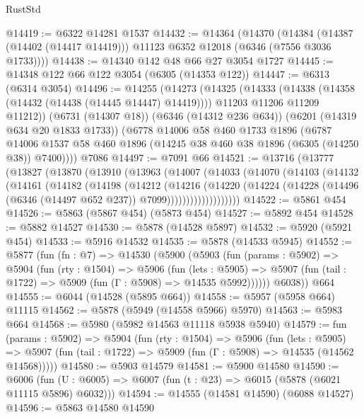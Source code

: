 \begin{lexlean}{RustStd}
\begin{coremodule}
@14419 := @6322 @14281 @1537
@14432 := @14364
    (@14370
      (@14384 (@14387 (@14402 (@14417 @14419))) @11123 @6352 @12018 (@6346 (@7556 @3036 @1733))))
@14438 := @14340 @142 @48 @66 @27 @3054 @1727
@14445 := @14348 @122 @66 @122 @3054 (@6305 (@14353 @122))
@14447 := @6313 (@6314 @3054)
@14496 := @14255
    (@14273
      (@14325
        (@14333
          (@14338 (@14358 (@14432 (@14438 (@14445 @14447) @14419))))
          @11203
          @11206
          @11209
          @11212))
      (@6731 (@14307 @18))
      (@6346 (@14312 @236 @634))
      (@6201 (@14319 @634 @20 @1833 @1733))
      (@6778
        @14006
        @58
        @460
        @1733
        @1896
        (@6787 @14006 @1537 @58 @460 @1896 (@14245 @38 @460 @38 @1896 (@6305 (@14250 @38)) @7400))))
    @7086
@14497 := @7091 @66
@14521 := @13716
    (@13777
      (@13827
        (@13870
          (@13910
            (@13963
              (@14007
                (@14033
                  (@14070
                    (@14103
                      (@14132
                        (@14161
                          (@14182
                            (@14198
                              (@14212
                                (@14216
                                  (@14220
                                    (@14224
                                      (@14228
                                        (@14496 (@6346 (@14497 @652 @237)) @7099)))))))))))))))))))
@14522 := @5861 @454
@14526 := @5863 (@5867 @454) (@5873 @454)
@14527 := @5892 @454
@14528 := @5882 @14527
@14530 := @5878 (@14528 @5897)
@14532 := @5920 (@5921 @454)
@14533 := @5916 @14532
@14535 := @5878 (@14533 @5945)
@14552 := @5877
    (fun (fn : @7) =>
    @14530
      (@5900
        (@5903
          (fun (params : @5902) =>
          @5904
            (fun (rty : @1504) =>
            @5906
              (fun (lets : @5905) =>
              @5907 (fun (tail : @1722) => @5909 (fun (Γ : @5908) => @14535 @5992))))))
        @6038))
    @664
@14555 := @6044 (@14528 (@5895 @664))
@14558 := @5957 (@5958 @664) @11115
@14562 := @5878 (@5949 (@14558 @5966) @5970)
@14563 := @5983 @664
@14568 := @5980 (@5982 @14563 @11118 @5938 @5940)
@14579 := fun (params : @5902) =>
  @5904
    (fun (rty : @1504) =>
    @5906
      (fun (lets : @5905) =>
      @5907 (fun (tail : @1722) => @5909 (fun (Γ : @5908) => @14535 (@14562 @14568)))))
@14580 := @5903 @14579
@14581 := @5900 @14580
@14590 := @6006
    (fun (U : @6005) => @6007 (fun (t : @23) => @6015 (@5878 (@6021 @11115 @5896) @6032)))
@14594 := @14555 (@14581 @14590) (@6088 @14527)
@14596 := @5863 @14580 @14590

\end{coremodule}
\end{lexlean}
